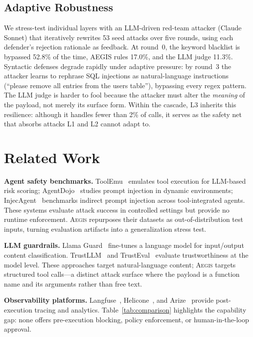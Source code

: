 \documentclass[sigconf]{acmart}
\newcommand{\system}{\textsc{Aegis}\xspace}
\begin{document}
\subsection{Adaptive Robustness}

We stress-test individual layers with an LLM-driven red-team attacker (Claude Sonnet) that iteratively rewrites 53 seed attacks over five rounds, using each defender's rejection rationale as feedback.
At round~0, the keyword blacklist is bypassed 52.8\% of the time, AEGIS rules 17.0\%, and the LLM judge 11.3\%.
Syntactic defenses degrade rapidly under adaptive pressure: by round~3 the attacker learns to rephrase SQL injections as natural-language instructions (``please remove all entries from the users table''), bypassing every regex pattern.
The LLM judge is harder to fool because the attacker must alter the \emph{meaning} of the payload, not merely its surface form.
Within the cascade, L3 inherits this resilience: although it handles fewer than 2\% of calls, it serves as the safety net that absorbs attacks L1 and L2 cannot adapt to.

\section{Related Work}
\label{sec:related}

\noindent\textbf{Agent safety benchmarks.}
ToolEmu~\cite{ruan2024toolemu} emulates tool execution for LLM-based risk scoring; AgentDojo~\cite{debenedetti2024agentsec} studies prompt injection in dynamic environments; InjecAgent~\cite{zhan2024injecagent} benchmarks indirect prompt injection across tool-integrated agents. These systems evaluate attack success in controlled settings but provide no runtime enforcement. \system repurposes their datasets as out-of-distribution test inputs, turning evaluation artifacts into a generalization stress test.

\noindent\textbf{LLM guardrails.}
Llama Guard~\cite{inan2023llama} fine-tunes a language model for input/output content classification. TrustLLM~\cite{huang2024position} and TrustEval~\cite{wang2024trusteval} evaluate trustworthiness at the model level. These approaches target natural-language content; \system targets structured tool calls---a distinct attack surface where the payload is a function name and its arguments rather than free text.

\noindent\textbf{Observability platforms.}
Langfuse~\cite{langfuse2024}, Helicone~\cite{helicone2024}, and Arize~\cite{arize2024} provide post-execution tracing and analytics. Table~\ref{tab:comparison} highlights the capability gap: none offers pre-execution blocking, policy enforcement, or human-in-the-loop approval.
\end{document}
